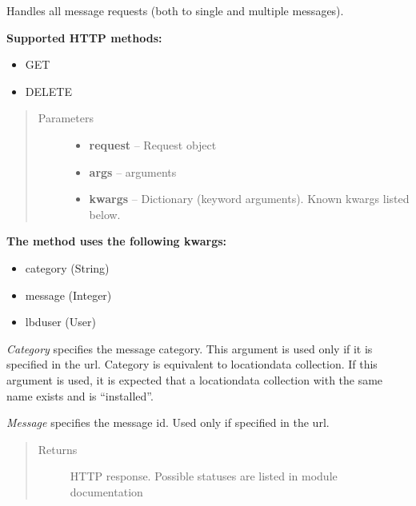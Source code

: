 \documentclass[letterpaper,10pt,english]{sphinxmanual}
\begin{document}
\begin{fulllineitems}
\label{codedoc/msgdoc:lbd_backend.LBD_REST_messagedata.views.msg_general}
Handles all message requests (both to single and multiple messages).

\textbf{Supported HTTP methods:}
\begin{itemize}
\item {} 
GET

\item {} 
DELETE

\end{itemize}
\begin{quote}\begin{description}
\item[{Parameters}] \leavevmode\begin{itemize}
\item {} 
\textbf{request} -- Request object

\item {} 
\textbf{args} -- arguments

\item {} 
\textbf{kwargs} -- Dictionary (keyword arguments). Known kwargs listed below.

\end{itemize}

\end{description}\end{quote}

\textbf{The method uses the following kwargs:}
\begin{itemize}
\item {} 
category (String)

\item {} 
message (Integer)

\item {} 
lbduser (User)

\end{itemize}

\emph{Category} specifies the message category. This argument is used only if it is specified in the url. Category
is equivalent to locationdata collection. If this argument is used, it is expected that a locationdata collection
with the same name exists and is ``installed''.

\emph{Message} specifies the message id. Used only if specified in the url.
\begin{quote}\begin{description}
\item[{Returns}] \leavevmode
HTTP response. Possible statuses are listed in module documentation

\end{description}\end{quote}

\end{fulllineitems}
\end{document}
